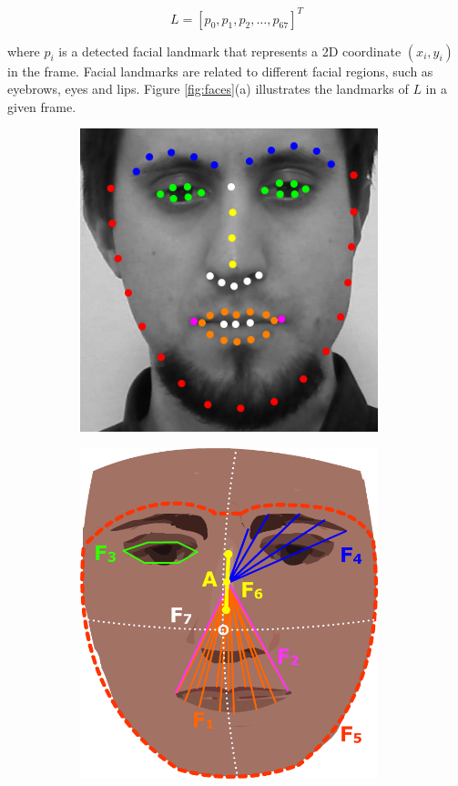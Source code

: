 \[
L = [p_0, p_1, p_2, \dots, p_{67}]^T
\]

where $p_i$ is a detected facial landmark that represents a 2D coordinate $(x_i, y_i)$ in the frame. Facial landmarks are related to different facial regions, such as eyebrows, eyes and lips. Figure \ref{fig:faces}(a) illustrates the landmarks of $L$ in a given frame.

\begin{figure}
\centering
  \begin{subfigure}[b]{0.5\textwidth}
    \includegraphics[width=0.95\textwidth]{figures/facial-landmarks-detail.png}
    \caption{}
    \label{fig:face-occlusion}
  \end{subfigure}%
  \begin{subfigure}[b]{0.5\textwidth}
    \centering
    \includegraphics[width=0.95\textwidth]{figures/facial-features.png}

\end{subfigure}
\end{figure}
